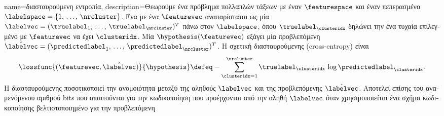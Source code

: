 {name={\foreignlanguage{greek}{διασταυρούμενη εντροπία}},
	description={\foreignlanguage{greek}{Θεωρούμε ένα πρόβλημα}  \foreignlanguage{greek}{πολλαπλών τάξεων με έναν} 
		 $\featurespace$ \foreignlanguage{greek}{και έναν πεπερασμένο}  
              	$\labelspace = \{1,\,\ldots,\,\nrcluster\}$.  \foreignlanguage{greek}{Ένα}  \foreignlanguage{greek}{με ένα} 
              	 $\featurevec$ \foreignlanguage{greek}{αναπαρίσταται ως μία}  
              	$\labelvec = (\truelabel_{1},\,\ldots,\,\truelabel_{\nrcluster})^{T}$ \foreignlanguage{greek}{πάνω στον $\labelspace$, όπου $\truelabel_{\clusteridx}$ 
		δηλώνει την}  \foreignlanguage{greek}{ένα τυχαία επιλεγμένο}  \foreignlanguage{greek}{με} 
		 $\featurevec$ \foreignlanguage{greek}{να έχει}  $\clusteridx$.  
		\foreignlanguage{greek}{Μία}  $\hypothesis(\featurevec)$ \foreignlanguage{greek}{εξάγει μία προβλεπόμενη} 
              	 $\hat{\labelvec} = (\predictedlabel_{1},\,\ldots,\,\predictedlabel_{\nrcluster})^{T}$. \foreignlanguage{greek}{Η σχετική} 
              	  \foreignlanguage{greek}{διασταυ\-ρού\-μενης} 
		 (cross-entropy) \foreignlanguage{greek}{είναι} \cite{coverthomas} 
             	\begin{equation}
                		\nonumber
                		\lossfunc{(\featurevec,\hat{\labelvec})}{\hypothesis}
                		\defeq - \sum_{\clusteridx=1}^{\nrcluster} 
                		\truelabel_{\clusteridx}\,\log \predictedlabel_{\clusteridx}.
              	\end{equation}
		\foreignlanguage{greek}{Η}  \foreignlanguage{greek}{διασταυρούμενης}  
		\foreignlanguage{greek}{ποσοτικοποιεί την ανομοιότητα μεταξύ της αληθούς}  $\labelvec$ \foreignlanguage{greek}{και 
		της προβλεπόμενης}  $\hat{\labelvec}$. \foreignlanguage{greek}{Αποτελεί επίσης}  
		\foreignlanguage{greek}{του αναμενόμενου αριθμού} bits \foreignlanguage{greek}{που απαιτούνται για την κωδικοποίηση} 
		 \foreignlanguage{greek}{που προέρχονται από την αληθή}  $\labelvec$ 
		\foreignlanguage{greek}{όταν χρησιμοποιείται ένα σχήμα κωδικοποίησης βελτιστοποιημένο για την προβλεπόμενη}  
}}
